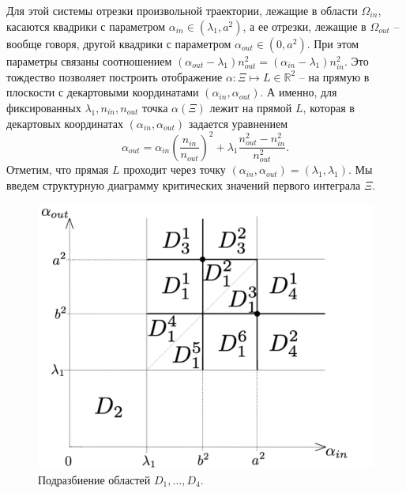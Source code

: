 Для этой системы отрезки произвольной траектории, лежащие в области $\Omega_{in}$, касаются квадрики с параметром $\alpha_{in} \in (\lambda_1, a^2)$, а ее отрезки, лежащие в $\Omega_{out}$ -- вообще говоря, другой квадрики с параметром $\alpha_{out} \in (0, a^2)$. При этом параметры связаны соотношением $(\alpha_{out} - \lambda_1) n_{out}^2 = (\alpha_{in} - \lambda_1) n_{in}^2$.
Это тождество позволяет построить отображение $\alpha: \Xi \mapsto  L \in \mathbb{R}^2$ -- на прямую в плоскости с декартовыми координатами $(\alpha_{in}, \alpha_{out})$. 
А именно, для фиксированных $\lambda_1, n_{in}, n_{out}$ точка $\alpha(\Xi)$ лежит на прямой $L$, которая в декартовых координатах $(\alpha_{in}, \alpha_{out})$ задается уравнением
\begin{equation}
\alpha_{out} = \alpha_{in} \left(\frac{n_{in}}{n_{out}}\right)^2 + \lambda_1 \frac{n_{out}^2 - n_{in}^2}{n_{out}^2}.
\label{eq:L_line}
\end{equation}
Отметим, что прямая $L$ проходит через точку $(\alpha_{in}, \alpha_{out}) = (\lambda_1, \lambda_1)$.
Мы введем структурную диаграмму критических значений первого интеграла $\Xi$. 
\begin{figure}[!htb]
\centering
\includegraphics[scale=0.1]{images/ch4/section2/problemA_subdivisions.pdf}
    \caption{Подразбиение областей $D_1, \ldots, D_4$.}
    \label{fig:intro_problemA_subdivisions}
\end{figure}

